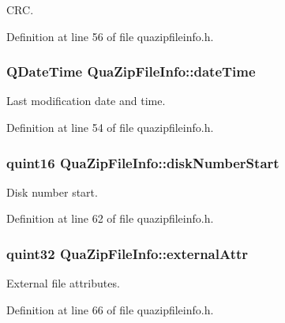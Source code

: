 C\-R\-C. 



Definition at line 56 of file quazipfileinfo.\-h.

\hypertarget{struct_qua_zip_file_info_ad6993d099436813a27fd31aebe42911a}{
\subsubsection[{date\-Time}]{\setlength{\rightskip}{0pt plus 5cm}Q\-Date\-Time Qua\-Zip\-File\-Info\-::date\-Time}}\label{struct_qua_zip_file_info_ad6993d099436813a27fd31aebe42911a}


Last modification date and time. 



Definition at line 54 of file quazipfileinfo.\-h.

\hypertarget{struct_qua_zip_file_info_aa70157fdc2bd8de10405055b4233050b}{
\subsubsection[{disk\-Number\-Start}]{\setlength{\rightskip}{0pt plus 5cm}quint16 Qua\-Zip\-File\-Info\-::disk\-Number\-Start}}\label{struct_qua_zip_file_info_aa70157fdc2bd8de10405055b4233050b}


Disk number start. 



Definition at line 62 of file quazipfileinfo.\-h.

\hypertarget{struct_qua_zip_file_info_afeb65ffdacc4fc0ba7848d4b37f62ecf}{
\subsubsection[{external\-Attr}]{\setlength{\rightskip}{0pt plus 5cm}quint32 Qua\-Zip\-File\-Info\-::external\-Attr}}\label{struct_qua_zip_file_info_afeb65ffdacc4fc0ba7848d4b37f62ecf}


External file attributes. 



Definition at line 66 of file quazipfileinfo.\-h.

